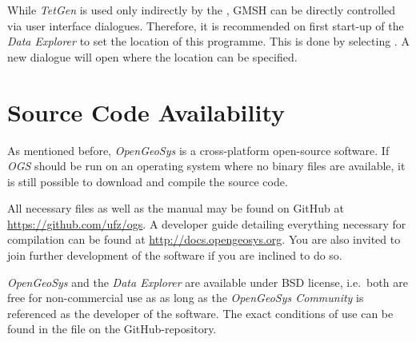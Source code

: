 While \emph{TetGen} is used only indirectly by the \de{}, GMSH can be directly controlled via user interface dialogues. Therefore, it is recommended on first start-up of  the \emph{Data Explorer} to set the location of this programme. This is done by selecting . A new dialogue will open where the location can be specified.

\section{Source Code Availability}

As mentioned before, \emph{OpenGeoSys} is a cross-platform open-source software. If \emph{OGS} should be run on an operating system where no binary files are available, it is still possible to download and compile the source code.

All necessary files as well as the manual may be found on GitHub at \url{https://github.com/ufz/ogs}. A developer guide detailing everything necessary for compilation can be found at \url{http://docs.opengeosys.org}. You are also invited to join further development of the software if you are inclined to do so.

\emph{OpenGeoSys} and the \emph{Data Explorer} are available under BSD license, i.e.~both are free for non-commercial use as as long as  the \emph{OpenGeoSys Community} is referenced as the developer of the software. The exact conditions of use can be found in the file  on the GitHub-repository.




